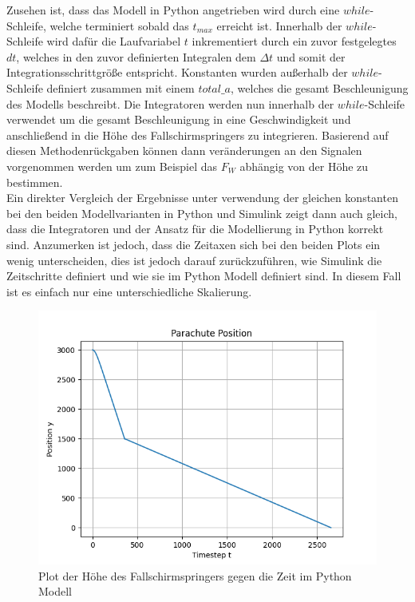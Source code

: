 \documentclass[]{iat}
\begin{document}
Zusehen ist, dass das Modell in Python angetrieben wird durch eine $while$-Schleife, welche terminiert sobald das $t_{max}$ erreicht ist. Innerhalb der $while$-Schleife wird dafür die Laufvariabel $t$ inkrementiert durch ein zuvor festgelegtes $dt$, welches in den zuvor definierten Integralen dem $\Delta t$ und somit der Integrationsschrittgröße entspricht. Konstanten wurden außerhalb der $while$-Schleife definiert zusammen mit einem $total\_a$, welches die gesamt Beschleunigung des Modells beschreibt. Die Integratoren werden nun innerhalb der $while$-Schleife verwendet um die gesamt Beschleunigung in eine Geschwindigkeit und anschließend in die Höhe des Fallschirmspringers zu integrieren. Basierend auf diesen Methodenrückgaben können dann veränderungen an den Signalen vorgenommen werden um zum Beispiel das $F_W$ abhängig von der Höhe zu bestimmen.\\
Ein direkter Vergleich der Ergebnisse unter verwendung der gleichen konstanten bei den beiden Modellvarianten in Python und Simulink zeigt dann auch gleich, dass die Integratoren und der Ansatz für die Modellierung in Python korrekt sind. Anzumerken ist jedoch, dass die Zeitaxen sich bei den beiden Plots ein wenig unterscheiden, dies ist jedoch darauf zurückzuführen, wie Simulink die Zeitschritte definiert und wie sie im Python Modell definiert sind. In diesem Fall ist es einfach nur eine unterschiedliche Skalierung.
\begin{figure}[H]
    \includegraphics[width=\textwidth]{graphics/python_parachute_s_plot.png}
    \centering
    \caption{Plot der Höhe des Fallschirmspringers gegen die Zeit im Python Modell}
    \label{fig:python_parachute_s_plot}
\end{figure}
\end{document}
